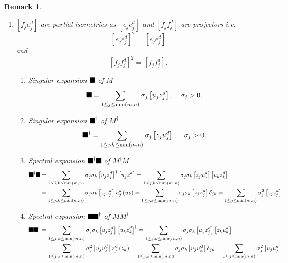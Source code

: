 \documentclass[aps,preprint]{revtex4}%
\providecommand{\U}[1]{\protect\rule{.1in}{.1in}}
\newtheorem{remark}[theorem]{Remark}
\begin{document}
\begin{remark}
\begin{enumerate}
\item $\left[  f_{j}e_{j}^{d}\right]  $ are partial isometries as $\left[
e_{j}e_{j}^{d}\right]  $ and $\left[  f_{j}f_{j}^{d}\right]  $ are projectors
i.e.
\begin{equation}
\left[  e_{j}e_{j}^{d}\right]  ^{2}=\left[  e_{j}e_{j}^{d}\right]
\end{equation}
and
\begin{equation}
\left[  f_{j}f_{j}^{d}\right]  ^{2}=\left[  f_{j}f_{j}^{d}\right]  .
\end{equation}


\begin{enumerate}
\item Singular expansion $\U{3a3} $ of $M$%
\begin{equation}
\U{3a3} =\sum_{1\leq j\leq\min\left(  m,n\right)  }\sigma_{j}\left[
u_{j}z_{j}^{d}\right]  ,\quad\sigma_{j}>0.
\end{equation}


\item Singular expansion $\U{3a3} ^{\dagger}$ of $M^{\dagger}$%
\begin{equation}
\U{3a3} ^{\dagger}=\sum_{1\leq j,k\leq\min\left(  m,n\right)  }\sigma
_{j}\left[  z_{j}u_{j}^{d}\right]  ,\quad\sigma_{j}>0.
\end{equation}


\item Spectral expansion $\U{3a3} ^{\dagger}\U{3a3} $ of $M^{\dagger}M$%
\begin{align}
\U{3a3} ^{\dagger}\U{3a3}  &  =\sum_{1\leq j,k\leq\min\left(  m,n\right)
}\sigma_{j}\sigma_{k}\left[  u_{j}z_{j}^{d}\right]  ^{\dagger}\left[
u_{j}z_{j}^{d}\right]  =\sum_{1\leq j,k\leq\min\left(  m,n\right)  }\sigma
_{j}\sigma_{k}\left[  z_{j}u_{j}^{d}\right]  \left[  u_{k}z_{k}^{d}\right] \\
&  =\sum_{1\leq j,k\leq\min\left(  m,n\right)  }\sigma_{j}\sigma_{k}\left[
z_{j}z_{j}^{d}\right]  u_{j}^{d}\left(  u_{k}\right)  =\sum_{1\leq j,k\leq
\min\left(  m,n\right)  }\sigma_{j}\sigma_{k}\left[  z_{j}z_{j}^{d}\right]
\delta_{jk}=\sum_{1\leq j\leq\min\left(  m,n\right)  }\sigma_{j}^{2}\left[
z_{j}z_{j}^{d}\right]  .
\end{align}


\item Spectral expansion $\U{3a3} \U{3a3} ^{\dagger}$ of $MM^{\dagger}$%
\begin{align}
\U{3a3} \U{3a3} ^{\dagger}  &  =\sum_{1\leq j,k\leq\min\left(  m,n\right)
}\sigma_{j}\sigma_{k}\left[  u_{j}z_{j}^{d}\right]  \left[  u_{k}z_{k}%
^{d}\right]  ^{\dagger}=\sum_{1\leq j,k\leq\min\left(  m,n\right)  }\sigma
_{j}\sigma_{k}\left[  u_{j}z_{j}^{d}\right]  \left[  z_{k}u_{k}^{d}\right] \\
&  =\sum_{1\leq j,k\leq\min\left(  m,n\right)  }\sigma_{j}^{2}\left[
u_{j}u_{k}^{d}\right]  z_{j}^{d}\left(  z_{k}\right)  =\sum_{1\leq j,k\leq
\min\left(  m,n\right)  }\sigma_{j}\sigma_{k}\left[  u_{j}u_{k}^{d}\right]
\delta_{jk}=\sum_{1\leq j\leq\min\left(  m,n\right)  }\sigma_{j}^{2}\left[
u_{j}u_{j}^{d}\right]  .
\end{align}


\end{enumerate}
\end{enumerate}
\end{remark}
\end{document}
